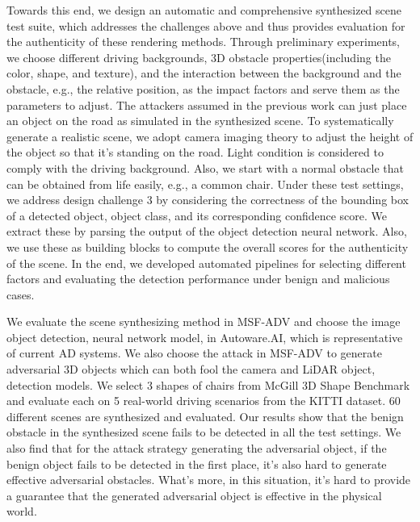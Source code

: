 Towards this end, we design an automatic and comprehensive synthesized scene test suite, which addresses the challenges above and thus provides evaluation for the authenticity of these rendering methods.
Through preliminary experiments, we choose different driving backgrounds, 3D obstacle properties(including the color, shape, and texture), and the interaction between the background and the obstacle, 
e.g., the relative position, as the impact factors and serve them as the parameters to adjust.
The attackers assumed in the previous work can just place an object on the road as simulated in the synthesized scene.
To systematically generate a realistic scene, we adopt camera imaging theory to adjust the height of the object so that it's standing on the road. 
Light condition is considered to comply with the driving background. 
Also, we start with a normal obstacle that can be obtained from life easily, e.g., a common chair.
Under these test settings, we address design challenge 3 by considering the correctness of the bounding box of a detected object, object class, and its corresponding confidence score.
We extract these by parsing the output of the object detection neural network. 
Also, we use these as building blocks to compute the overall scores for the authenticity of the scene.
In the end, we developed automated pipelines for selecting different factors and evaluating the detection performance under benign and malicious cases.

We evaluate the scene synthesizing method in MSF-ADV\cite{msf-adv} and choose the image object detection, neural network model, in Autoware.AI\cite{autoware}, which is representative of current AD systems.
We also choose the attack in MSF-ADV\cite{msf-adv} to generate adversarial 3D objects which can both fool the camera and LiDAR object, detection models.
We select 3 shapes of chairs from McGill 3D Shape Benchmark\cite{McGill} and evaluate each on 5 real-world driving scenarios from the KITTI dataset\cite{kitti}.
60 different scenes are synthesized and evaluated. 
Our results show that the benign obstacle in the synthesized scene fails to be detected in all the test settings.
We also find that for the attack strategy generating the adversarial object, if the benign object fails to be detected in the first place, 
it's also hard to generate effective adversarial obstacles. 
What's more, in this situation, it's hard to provide a guarantee that the generated adversarial object is effective in the physical world.

